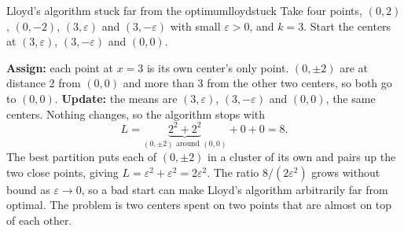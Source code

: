\documentclass[11pt]{article}
\begin{document}
\begin{example}{Lloyd's algorithm stuck far from the optimum}{lloydstuck}
Take four points, $(0,2)$, $(0,-2)$, $(3,\varepsilon)$ and $(3,-\varepsilon)$ with small $\varepsilon>0$, and $k=3$. Start the centers at $(3,\varepsilon)$, $(3,-\varepsilon)$ and $(0,0)$.
\begin{center}
\end{center}
\textbf{Assign:} each point at $x=3$ is its own center's only point. $(0,\pm2)$ are at distance $2$ from $(0,0)$ and more than $3$ from the other two centers, so both go to $(0,0)$. \textbf{Update:} the means are $(3,\varepsilon)$, $(3,-\varepsilon)$ and $(0,0)$, the same centers. Nothing changes, so the algorithm stops with
\[
L=\underbrace{2^2+2^2}_{(0,\pm2)\text{ around }(0,0)}+0+0=8 .
\]
The best partition puts each of $(0,\pm2)$ in a cluster of its own and pairs up the two close points, giving $L=\varepsilon^2+\varepsilon^2=2\varepsilon^2$. The ratio $8/(2\varepsilon^2)$ grows without bound as $\varepsilon\to0$, so a bad start can make Lloyd's algorithm arbitrarily far from optimal. The problem is two centers spent on two points that are almost on top of each other.
\end{example}
\end{document}
